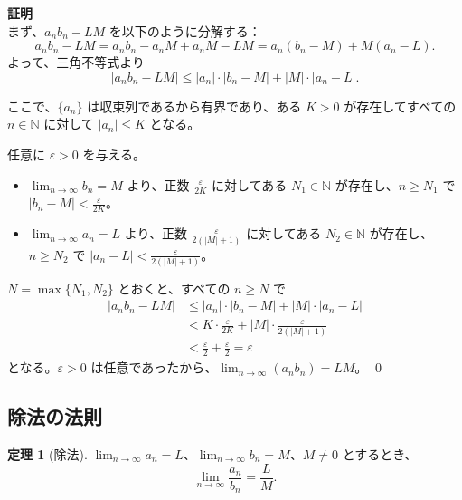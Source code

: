 \documentclass[11pt,a4paper]{jsarticle}
\theoremstyle{definition}
\newtheorem{theorem}{定理}[section]
\newcommand{\N}{\mathbb{N}}
\newcommand{\eps}{\varepsilon}
\begin{document}
\begin{proofbox}
\textbf{証明}\ \\
\noindent
まず、$a_n b_n - LM$ を以下のように分解する：
\[
a_n b_n - LM
= a_n b_n - a_n M + a_n M - LM
= a_n(b_n - M) + M(a_n - L).
\]
よって、三角不等式より
\[
|a_n b_n - LM|
\leq |a_n| \cdot |b_n - M| + |M| \cdot |a_n - L|.
\]

ここで、$\{a_n\}$ は収束列であるから有界であり、ある $K > 0$ が存在してすべての $n \in \N$ に対して $|a_n| \leq K$ となる。

任意に $\eps > 0$ を与える。
\begin{itemize}[itemsep=0.2em]
\item $\lim_{n \to \infty} b_n = M$ より、正数 $\frac{\eps}{2K}$ に対してある $N_1 \in \N$ が存在し、$n \geq N_1$ で $|b_n - M| < \frac{\eps}{2K}$。
\item $\lim_{n \to \infty} a_n = L$ より、正数 $\frac{\eps}{2(|M|+1)}$ に対してある $N_2 \in \N$ が存在し、$n \geq N_2$ で $|a_n - L| < \frac{\eps}{2(|M|+1)}$。{{\color{red}{ ここで、$|M| + 1$ を分母に入れたのは、$|M|$ が 0 の場合も考慮して、分母が正になるようにするためである。}}}
\end{itemize}

$N = \max\{N_1, N_2\}$ とおくと、すべての $n \geq N$ で
\begin{align*}
|a_n b_n - LM|
&\leq |a_n| \cdot |b_n - M| + |M| \cdot |a_n - L| \\
&< K \cdot \frac{\eps}{2K} + |M| \cdot \frac{\eps}{2(|M|+1)} \\
&< \frac{\eps}{2} + \frac{\eps}{2}
= \eps
\end{align*}
となる。$\eps > 0$ は任意であったから、$\lim_{n \to \infty} (a_n b_n) = LM$。 \qed
\end{proofbox}

\subsection{除法の法則}

\begin{theorembox}[定理：商の極限]
\begin{theorem}[除法]\label{thm:division}
$\lim_{n \to \infty} a_n = L$、$\lim_{n \to \infty} b_n = M$、$M \neq 0$ とするとき、
\[
\lim_{n \to \infty} \frac{a_n}{b_n} = \frac{L}{M}.
\]
\end{theorem}
\end{theorembox}
\end{document}
